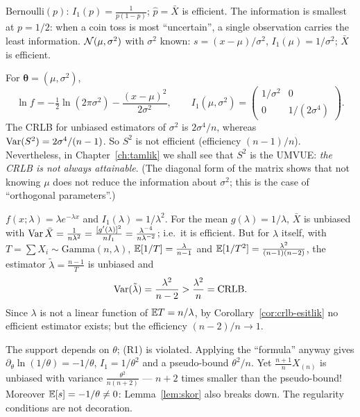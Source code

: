 \documentclass[main.tex]{subfiles}
\begin{document}
\begin{example}
$\text{Bernoulli}(p)$: $I_1(p)=\frac{1}{p(1-p)}$; $\hat p=\bar X$ is efficient. The information is smallest at $p=1/2$: when a coin toss is most ``uncertain'', a single observation carries the least information.
$\mathcal{N}(\mu,\sigma^2)$ with $\sigma^2$ known: $s=(x-\mu)/\sigma^2$, $I_1(\mu)=1/\sigma^2$; $\bar X$ is efficient.
\end{example}

\begin{example}\label{ex:normal-fisher-matris}
For $\bm\theta=(\mu,\sigma^2)$,
\[
\ln f=-\tfrac12\ln(2\pi\sigma^2)-\frac{(x-\mu)^2}{2\sigma^2},\qquad
I_1(\mu,\sigma^2)=\begin{pmatrix}1/\sigma^2 & 0\\ 0 & 1/(2\sigma^4)\end{pmatrix}.
\]
The CRLB for unbiased estimators of $\sigma^2$ is $2\sigma^4/n$, whereas $\operatorname{Var}(S^2)=2\sigma^4/(n-1)$. So $S^2$ is not efficient (efficiency $(n-1)/n$). Nevertheless, in Chapter~\ref{ch:tamlik} we shall see that $S^2$ is the UMVUE: \emph{the CRLB is not always attainable}. (The diagonal form of the matrix shows that not knowing $\mu$ does not reduce the information about $\sigma^2$; this is the case of ``orthogonal parameters''.)
\end{example}

\begin{example}\label{ex:ustel-crlb}
$f(x;\lambda)=\lambda e^{-\lambda x}$ and $I_1(\lambda)=1/\lambda^2$. For the mean $g(\lambda)=1/\lambda$, $\bar X$ is unbiased with $\operatorname{Var}\bar X=\frac{1}{n\lambda^2}=\frac{[g'(\lambda)]^2}{nI_1}=\frac{\lambda^{-4}}{n\lambda^{-2}}$; i.e.\ it is efficient. But for $\lambda$ itself, with $T=\sum X_i\sim\text{Gamma}(n,\lambda)$, $\mathbb{E}[1/T]=\frac{\lambda}{n-1}$ and $\mathbb{E}[1/T^2]=\frac{\lambda^2}{(n-1)(n-2)}$, the estimator $\tilde\lambda=\frac{n-1}{T}$ is unbiased and
\[
\operatorname{Var}(\tilde\lambda)=\frac{\lambda^2}{n-2}>\frac{\lambda^2}{n}=\text{CRLB}.
\]
Since $\lambda$ is not a linear function of $\mathbb{E} T=n/\lambda$, by Corollary~\ref{cor:crlb-esitlik} no efficient estimator exists; but the efficiency $(n-2)/n\to1$.
\end{example}

\begin{example}\label{ex:uniform-crlb}
The support depends on $\theta$; (R1) is violated. Applying the ``formula'' anyway gives $\partial_\theta\ln(1/\theta)=-1/\theta$, $I_1=1/\theta^2$ and a pseudo-bound $\theta^2/n$. Yet $\frac{n+1}{n}X_{(n)}$ is unbiased with variance $\frac{\theta^2}{n(n+2)}$ --- $n+2$ times smaller than the pseudo-bound! Moreover $\mathbb{E}[s]=-1/\theta\neq0$: Lemma~\ref{lem:skor} also breaks down. The regularity conditions are not decoration.
\end{example}
\end{document}
